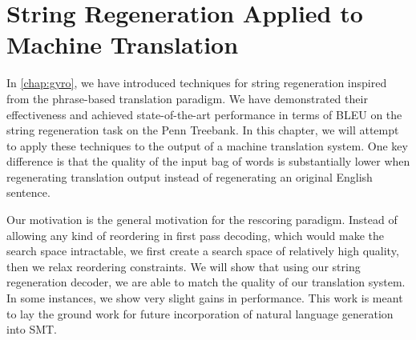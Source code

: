 \chapter{String Regeneration Applied to Machine Translation}
\label{chap:gyroTrans}


In \autoref{chap:gyro}, we have introduced
techniques for string regeneration inspired from
the phrase-based translation paradigm.
We have demonstrated their effectiveness
and achieved state-of-the-art performance in terms of
BLEU on the string regeneration task on the Penn Treebank.
In this chapter, we will attempt to apply these techniques to the output
of a machine translation system. One key difference is that
the quality of the input bag of words is substantially lower when
regenerating translation output instead of regenerating
an original English sentence.

Our motivation is the general motivation for the rescoring paradigm.
Instead of allowing any kind of reordering in first pass
decoding, which would make the search space intractable, we first create a
search space of relatively high
quality, then we relax reordering constraints.
We will show that using our string regeneration decoder,
we are able to match the quality of our translation
system. In some instances, we show very slight gains in
performance. This work is meant to lay the ground
work for future incorporation of natural language
generation into SMT.

